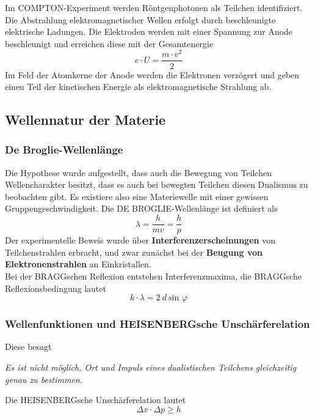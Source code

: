 \documentclass[12pt,a4paper,ngerman]{article}
\begin{document}
Im COMPTON-Experiment werden Röntgenphotonen als Teilchen identifiziert. Die Abstrahlung elektromagnetischer Wellen erfolgt durch beschleunigte elektrische Ladungen. Die Elektroden werden mit einer Spannung zur Anode beschleunigt und erreichen diese mit der Gesamtenergie
\begin{equation}
e \cdot U = \frac{m \cdot v^2}{2}
\end{equation}
Im Feld der Atomkerne der Anode werden die Elektronen verzögert und geben einen Teil der kinetischen Energie als elektromagnetische Strahlung ab. 




\subsection{Wellennatur der Materie}

\subsubsection{De Broglie-Wellenlänge}

Die Hypothese wurde aufgestellt, dass auch die Bewegung von Teilchen Wellencharakter besitzt, dass es auch bei bewegten Teilchen diesen Dualismus zu beobachten gibt. Es existiere also eine Materiewelle mit einer gewissen Gruppengeschwindigkeit. Die DE BROGLIE-Wellenlänge ist definiert als
\begin{equation}
\lambda = \frac{h}{mv} = \frac{h}{p}
\end{equation}
Der experimentelle Beweis wurde über \textbf{Interferenzerscheinungen} von Teilchenstrahlen erbracht, und zwar zunächst bei der \textbf{Beugung von Elektronenstrahlen} an Einkristallen. \\
Bei der BRAGGschen Reflexion entstehen Interferenzmaxima, die BRAGGsche Reflexionsbedingung lautet
\begin{equation}
k \cdot \lambda = 2 \ d \ \text{sin }\varphi
\end{equation}


\subsubsection{Wellenfunktionen und HEISENBERGsche Unschärferelation}
Diese besagt
\begin{center}
\textit{Es ist nicht möglich, Ort und Impuls eines dualistischen Teilchens gleichzeitig genau zu bestimmen.}
\end{center}
Die HEISENBERGsche Unschärferelation lautet
\begin{equation}
\Delta x \cdot \Delta p \geq h
\end{equation}
\end{document}
